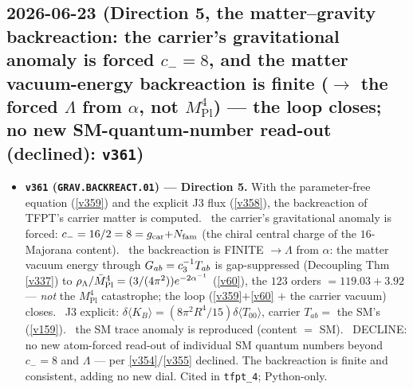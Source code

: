 \subsection*{2026-06-23 (Direction 5, the matter--gravity backreaction: the carrier's gravitational anomaly is forced $c_-{=}8$, and the matter vacuum-energy backreaction is finite ($\to$ the forced $\Lambda$ from $\alpha$, not $M_{\mathrm{Pl}}^4$) --- the loop closes; no new SM-quantum-number read-out (declined): \texttt{v361})}
\begin{itemize}
\item \textbf{\texttt{v361} (\texttt{GRAV.BACKREACT.01}) --- Direction 5.} With the parameter-free equation (\vref{v359})
and the explicit J3 flux (\vref{v358}), the backreaction of TFPT's carrier matter is computed. \mE\ the carrier's
gravitational anomaly is forced: $c_-=16/2=8=g_{\mathrm{car}}{+}N_{\mathrm{fam}}$ (the chiral central charge of the $16$-Majorana content).
\mE\ the backreaction is FINITE $\to\Lambda$ from $\alpha$: the matter vacuum energy through $G_{ab}=c_3^{-1}T_{ab}$
is gap-suppressed (Decoupling Thm \vref{v337}) to $\rho_\Lambda/\bar M_{\mathrm{Pl}}^4=(3/(4\pi^2))e^{-2\alpha^{-1}}$ (\vref{v60}),
the $123$ orders $=119.03+3.92$ --- \emph{not} the $M_{\mathrm{Pl}}^4$ catastrophe; the loop (\vref{v359}$+$\vref{v60}
$+$ the carrier vacuum) closes. \mE\ J3 explicit: $\delta\langle K_B\rangle=(8\pi^2R^4/15)\delta\langle T_{00}\rangle$,
carrier $T_{ab}=$ the SM's (\vref{v159}). \mC\ the SM trace anomaly is reproduced (content $=$ SM). \mO\ DECLINE: no
new atom-forced read-out of individual SM quantum numbers beyond $c_-{=}8$ and $\Lambda$ --- per \vref{v354}/\vref{v355}
declined. The backreaction is finite and consistent, adding no new dial. Cited in \texttt{tfpt\_4}; Python-only.
\end{itemize}

